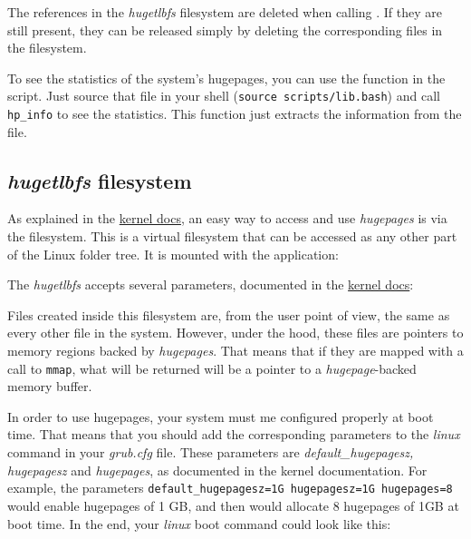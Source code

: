 \documentclass[oneside]{hpman}
\begin{document}
The references in the \textit{hugetlbfs} filesystem are deleted when calling . If they are still present, they can be released simply by deleting the corresponding files in the filesystem.

To see the statistics of the system's hugepages, you can use the  function in the  script. Just source that file in your shell (\texttt{source scripts/lib.bash}) and call \texttt{hp\_info} to see the statistics. This function just extracts the information from the  file.

\subsection{\textit{hugetlbfs} filesystem}
\label{sec:hugepages:hugetlbfs}

As explained in the \href{https://www.kernel.org/doc/Documentation/vm/hugetlbpage.txt}{kernel docs}, an easy way to access and use \textit{hugepages} is via the  filesystem. This is a virtual filesystem that can be accessed as any other part of the Linux folder tree. It is mounted with the  application:


The \textit{hugetlbfs} accepts several parameters, documented in the \href{https://www.kernel.org/doc/Documentation/vm/hugetlbpage.txt}{kernel docs}:


Files created inside this filesystem are, from the user point of view, the same as every other file in the system. However, under the hood, these files are pointers to memory regions backed by \textit{hugepages}. That means that if they are mapped with a call to \texttt{mmap}, what will be returned will be a pointer to a \textit{hugepage}-backed memory buffer.

In order to use hugepages, your system must me configured properly at boot time. That means that you should add the corresponding parameters to the \textit{linux} command in your \textit{grub.cfg} file. These parameters are \textit{default\_hugepagesz, hugepagesz} and \textit{hugepages}, as documented in the kernel documentation. For example, the parameters \texttt{default\_hugepagesz=1G hugepagesz=1G hugepages=8} would enable hugepages of 1 GB, and then would allocate 8 hugepages of 1GB at boot time. In the end, your \textit{linux} boot command could look like this:
\end{document}
